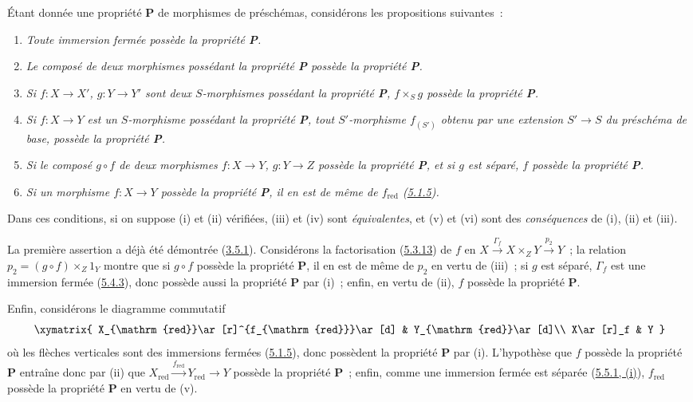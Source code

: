 \begin{remark}[5.5.12]
\label{I.5.5.12-fr}
\normalfont Étant donnée une propriété \textbf{P} de morphismes de préschémas,
considérons les propositions suivantes~:
\begin{enumerate}
  \item[\rm(i)] \emph{Toute immersion fermée possède la propriété \textbf{P}.}
  \item[\rm(ii)] \emph{Le composé de deux morphismes possédant la propriété
    \textbf{P} possède la propriété \textbf{P}.}
  \item[\rm(iii)] \emph{Si $f:X\to X'$, $g:Y\to Y'$ sont deux $S$-morphismes
    possédant la propriété \textbf{P}, $f\times_S g$ possède la propriété
    \textbf{P}.}

  \item[\rm(iv)] \emph{Si $f:X\to Y$ est un $S$-morphisme possédant la
    propriété \textbf{P}, tout $S'$-morphisme $f_{(S')}$ obtenu par une
    extension $S'\to S$ du préschéma de base, possède la propriété
    \textbf{P}.}
  \item[\rm(v)] \emph{Si le composé $g\circ f$ de deux morphismes
    $f:X\to Y$, $g:Y\to Z$ possède la propriété \textbf{P}, et si $g$ est
    séparé, $f$ possède la propriété \textbf{P}.}
  \item[\rm(vi)] \emph{Si un morphisme $f:X\to Y$ possède la propriété
    \textbf{P}, il en est de même de $f_{\mathrm{red}}$
    (\hyperref[I.5.1.5-fr]{5.1.5}).}
\end{enumerate}

Dans ces conditions, si on suppose (i) et (ii) vérifiées, (iii) et (iv) sont
\emph{équivalentes}, et (v) et (vi) sont des \emph{conséquences} de (i), (ii)
et (iii).

La première assertion a déjà été démontrée
(\hyperref[I.3.5.1-fr]{3.5.1}). Considérons la factorisation
(\hyperref[I.5.3.13-fr]{5.3.13}) de $f$ en
$X\xrightarrow{\Gamma_f}X\times_Z Y\xrightarrow{p_2}Y$~; la relation
$p_2=(g\circ f)\times_Z 1_Y$ montre que si $g\circ f$ possède la propriété
\textbf{P}, il en est de même de $p_2$ en vertu de (iii)~; si $g$ est séparé,
$\Gamma_f$ est une immersion fermée
(\hyperref[I.5.4.3-fr]{5.4.3}), donc possède aussi la propriété \textbf{P} par
(i)~; enfin, en vertu de (ii), $f$ possède la propriété \textbf{P}.

Enfin, considérons le diagramme commutatif
\[
  \xymatrix{
    X_{\mathrm{red}}\ar[r]^{f_{\mathrm{red}}}\ar[d] &
    Y_{\mathrm{red}}\ar[d]\\
    X\ar[r]_f &
    Y
  }
\]
où les flèches verticales sont des immersions fermées
(\hyperref[I.5.1.5-fr]{5.1.5}), donc possèdent la propriété \textbf{P} par
(i). L'hypothèse que $f$ possède la propriété \textbf{P} entraîne donc par
(ii) que
$X_{\mathrm{red}}\xrightarrow{f_{\mathrm{red}}}Y_{\mathrm{red}}\to Y$
possède la propriété \textbf{P}~; enfin, comme une immersion fermée est
séparée (\hyperref[I.5.5.1-fr]{5.5.1, (i)}), $f_{\mathrm{red}}$ possède la
propriété \textbf{P} en vertu de (v).


\end{remark}
